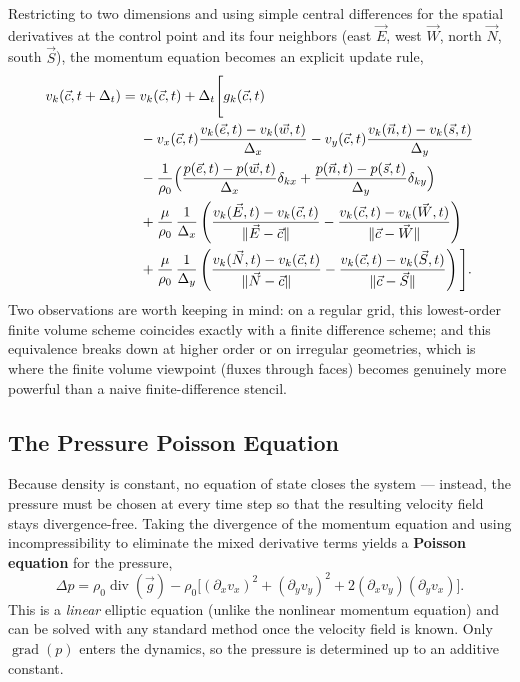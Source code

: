 \documentclass[11pt]{article}
\newcommand{\vg}{\vec{g}}
\begin{document}
Restricting to two dimensions and using simple central differences for the spatial derivatives at the control point and its four neighbors (east $\vec E$, west $\vec W$, north $\vec N$, south $\vec S$), the momentum equation becomes an explicit update rule,
\begin{align}
  v_k(\vec c, t+\Delta_t) = {} & v_k(\vec c,t) + \Delta_t\Bigg[g_k(\vec c,t)\notag\\
  & - v_x(\vec c,t)\frac{v_k(\vec e,t)-v_k(\vec w,t)}{\Delta_x} - v_y(\vec c,t)\frac{v_k(\vec n,t)-v_k(\vec s,t)}{\Delta_y}\notag\\
  & -\frac{1}{\rho_0}\Big(\frac{p(\vec e,t)-p(\vec w,t)}{\Delta_x}\delta_{kx} + \frac{p(\vec n,t)-p(\vec s,t)}{\Delta_y}\delta_{ky}\Big)\notag\\
  & + \frac{\mu}{\rho_0}\,\frac{1}{\Delta_x}\left(\frac{v_k(\vec E,t)-v_k(\vec c,t)}{\|\vec E-\vec c\|} - \frac{v_k(\vec c,t)-v_k(\vec W,t)}{\|\vec c-\vec W\|}\right)\notag\\
  & + \frac{\mu}{\rho_0}\,\frac{1}{\Delta_y}\left(\frac{v_k(\vec N,t)-v_k(\vec c,t)}{\|\vec N-\vec c\|} - \frac{v_k(\vec c,t)-v_k(\vec S,t)}{\|\vec c-\vec S\|}\right)\Bigg].
\end{align}
Two observations are worth keeping in mind: on a regular grid, this lowest-order finite volume scheme coincides exactly with a finite difference scheme; and this equivalence breaks down at higher order or on irregular geometries, which is where the finite volume viewpoint (fluxes through faces) becomes genuinely more powerful than a naive finite-difference stencil.

\subsection{The Pressure Poisson Equation}
\label{sec:pressure-poisson}

Because density is constant, no equation of state closes the system — instead, the pressure must be chosen at every time step so that the resulting velocity field stays divergence-free. Taking the divergence of the momentum equation and using incompressibility to eliminate the mixed derivative terms yields a \textbf{Poisson equation} for the pressure,
\begin{equation}
  \Delta p = \rho_0\operatorname{div}(\vg) - \rho_0\Big[(\partial_x v_x)^2 + (\partial_y v_y)^2 + 2(\partial_x v_y)(\partial_y v_x)\Big].
  \label{eq:poisson}
\end{equation}
This is a \emph{linear} elliptic equation (unlike the nonlinear momentum equation) and can be solved with any standard method once the velocity field is known. Only $\operatorname{grad}(p)$ enters the dynamics, so the pressure is determined up to an additive constant.
\end{document}

